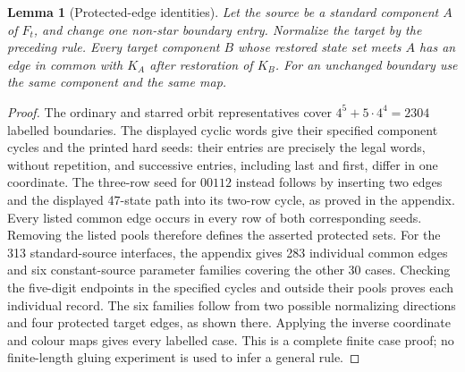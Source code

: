 \documentclass[11pt]{article}
\newtheorem{lemma}[theorem]{Lemma}
\theoremstyle{remark}
\numberwithin{equation}{section}
\numberwithin{table}{section}
\begin{document}
\begin{lemma}[Protected-edge identities]\label{lem:pentagon-protection}
Let the source be a standard component $A$ of $F_t$, and change one
non-star boundary entry. Normalize the target by the preceding rule.
Every target component $B$ whose restored state set meets $A$ has an
edge in common with $K_A$ after restoration of $K_B$.
For an unchanged boundary use the same component and the same map.
\end{lemma}
\begin{proof}
The ordinary and starred orbit representatives cover
$4^5+5\cdot4^4=2304$ labelled boundaries. The displayed cyclic words
give their specified component cycles and the printed hard seeds:
their entries are precisely the legal words, without repetition,
and successive entries, including last and first, differ in one
coordinate. The three-row seed for $00112$ instead follows by
inserting two edges and the displayed 47-state path into its
two-row cycle, as proved in the appendix. Every listed common
edge occurs in every row of both corresponding seeds.
Removing the listed pools therefore defines the asserted protected sets.
For the 313 standard-source interfaces, the appendix gives 283
individual common edges and six constant-source parameter families
covering the other 30 cases. Checking the five-digit endpoints in
the specified cycles and outside their pools proves each individual
record. The six families follow from two possible normalizing
directions and four protected target edges, as shown there. Applying
the inverse coordinate and colour maps gives every labelled case. This is a complete finite case proof;
no finite-length gluing experiment is used to infer a general rule.
\end{proof}
\end{document}

